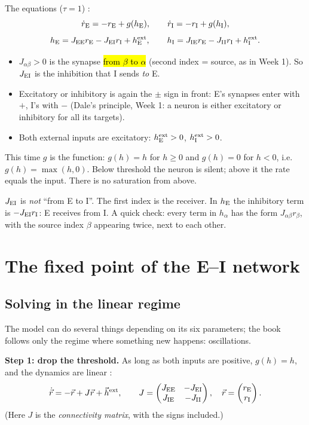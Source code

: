 The equations ($\tau=1$) :
\[ \dot r_{\mathrm{E}}=-r_{\mathrm{E}}+g(h_{\mathrm{E}}),\qquad \dot r_{\mathrm{I}}=-r_{\mathrm{I}}+g(h_{\mathrm{I}}), \]
\[ h_{\mathrm{E}}=J_{\mathrm{E}\mathrm{E}}r_{\mathrm{E}}-J_{\mathrm{E}\mathrm{I}}r_{\mathrm{I}}+h_{\mathrm{E}}^{\text{ext}},\qquad h_{\mathrm{I}}=J_{\mathrm{I}\mathrm{E}}r_{\mathrm{E}}-J_{\mathrm{I}\mathrm{I}}r_{\mathrm{I}}+h_{\mathrm{I}}^{\text{ext}}. \]

\begin{itemize}
  \item $J_{\alpha\beta}>0$ is the synapse \hl{from $\beta$ to $\alpha$} (second index = source, as in Week 1). So $J_{\mathrm{E}\mathrm{I}}$ is the inhibition that I sends \emph{to} E.
  \item Excitatory or inhibitory is again the $\pm$ sign in front: E's synapses enter with $+$, I's with $-$ (Dale's principle, Week 1: a neuron is either excitatory or inhibitory for all its targets).
  \item Both external inputs are excitatory: $h_{\mathrm{E}}^{\text{ext}}>0$, $h_{\mathrm{I}}^{\text{ext}}>0$.
\end{itemize}

\begin{defn}
This time $g$ is the  function: $g(h)=h$ for $h\ge0$ and $g(h)=0$ for $h<0$, i.e.\ $g(h)=\max(h,0)$. Below threshold the neuron is silent; above it the rate equals the input. There is no saturation from above.
\end{defn}

\begin{pitfall}
$J_{\mathrm{E}\mathrm{I}}$ is \emph{not} ``from E to I''. The first index is the receiver. In $h_{\mathrm{E}}$ the inhibitory term is $-J_{\mathrm{E}\mathrm{I}}r_{\mathrm{I}}$: E receives from I. A quick check: every term in $h_\alpha$ has the form $J_{\alpha\beta}r_\beta$, with the source index $\beta$ appearing twice, next to each other.
\end{pitfall}

\section{The fixed point of the E--I network}

\subsection{Solving in the linear regime}

The model can do several things depending on its six parameters; the book follows only the regime where something new happens: oscillations.

\textbf{Step 1: drop the threshold.} As long as both inputs are positive, $g(h)=h$, and the dynamics are linear :
\[ \dot{\vec r}=-\vec r+J\vec r+\vec h^{\text{ext}},\qquad J=\begin{pmatrix}J_{\mathrm{E}\mathrm{E}}&-J_{\mathrm{E}\mathrm{I}}\\J_{\mathrm{I}\mathrm{E}}&-J_{\mathrm{I}\mathrm{I}}\end{pmatrix},\quad \vec r=\begin{pmatrix}r_{\mathrm{E}}\\r_{\mathrm{I}}\end{pmatrix}. \]
(Here $J$ is the \emph{connectivity matrix}, with the signs included.)

